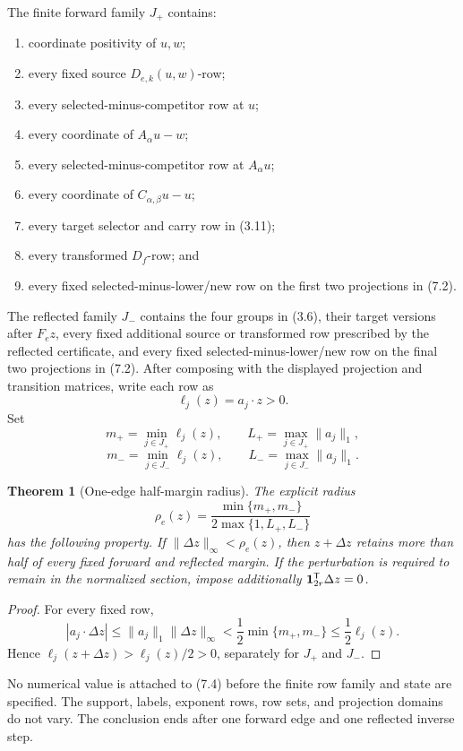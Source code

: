 \documentclass[11pt]{article}
\newtheorem{theorem}{Theorem}[section]
\theoremstyle{definition}
\theoremstyle{remark}
\begin{document}
The finite forward family \(J_+\) contains:
\begin{enumerate}[label=(\arabic*)]
\item coordinate positivity of \(u,w\);
\item every fixed source \(D_{e,k}(u,w)\)-row;
\item every selected-minus-competitor row at \(u\);
\item every coordinate of \(A_\alpha u-w\);
\item every selected-minus-competitor row at \(A_\alpha u\);
\item every coordinate of \(C_{\alpha,\beta}u-u\);
\item every target selector and carry row in (3.11);
\item every transformed \(D_f\)-row; and
\item every fixed selected-minus-lower/new row on the first two projections
in (7.2).
\end{enumerate}
The reflected family \(J_-\) contains the four groups in (3.6), their
target versions after \(F_ez\), every fixed additional source or transformed
row prescribed by the reflected certificate, and every fixed
selected-minus-lower/new row on the final two projections in (7.2).
After composing with the displayed projection and transition matrices,
write each row as
\[
 \ell_j(z)=a_j\cdot z>0.
\]
Set
\[
 m_+=\min_{j\in J_+}\ell_j(z),\qquad
 L_+=\max_{j\in J_+}\|a_j\|_1,
\]
\[
 m_-=\min_{j\in J_-}\ell_j(z),\qquad
 L_-=\max_{j\in J_-}\|a_j\|_1.
\tag{7.3}
\]

\begin{theorem}[One-edge half-margin radius]
\label{thm:radius}
The explicit radius
\[
 \rho_e(z)=
 \frac{\min\{m_+,m_-\}}
      {2\max\{1,L_+,L_-\}}
\tag{7.4}
\]
has the following property.  If
\(\|\Delta z\|_\infty<\rho_e(z)\), then \(z+\Delta z\) retains more than
half of every fixed forward and reflected margin.  If the perturbation is
required to remain in the normalized section, impose additionally
\(\mathbf{1}_{2r}^{\mathsf{T}}\Delta z=0\).
\end{theorem}

\begin{proof}
For every fixed row,
\[
 |a_j\cdot\Delta z|
 \leq\|a_j\|_1\|\Delta z\|_\infty
 <\frac12\min\{m_+,m_-\}
 \leq\frac12\ell_j(z).
\]
Hence \(\ell_j(z+\Delta z)>\ell_j(z)/2>0\), separately for \(J_+\) and
\(J_-\).
\end{proof}

No numerical value is attached to (7.4) before the finite row family and
state are specified.  The support, labels, exponent rows, row sets, and
projection domains do not vary.  The conclusion ends after one forward
edge and one reflected inverse step.
\end{document}
